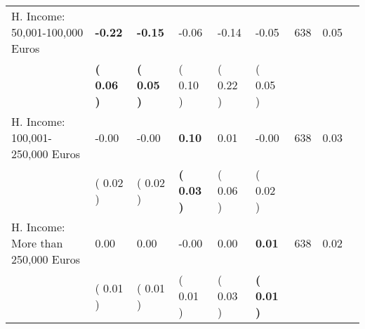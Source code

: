 \begin{tabular}{L{6.2cm} C{1.8cm} C{1.8cm} C{1.8cm} C{1.8cm} C{1.8cm} C{1.8cm} C{0.3cm} C{0.3cm}}
H. Income: 50,001-100,000 Euros & \textbf{    -0.22} & \textbf{    -0.15} &     -0.06 &     -0.14 &     -0.05  & 638 &       0.05 \\ 
 & \textbf{(     0.06 )} & \textbf{(     0.05 )} & (     0.10 ) & (     0.22 ) & (     0.05 )  & \\
H. Income: 100,001-250,000 Euros &     -0.00 &     -0.00 & \textbf{     0.10} &      0.01 &     -0.00  & 638 &       0.03 \\ 
 & (     0.02 ) & (     0.02 ) & \textbf{(     0.03 )} & (     0.06 ) & (     0.02 )  & \\
H. Income: More than 250,000 Euros &      0.00 &      0.00 &     -0.00 &      0.00 & \textbf{     0.01}  & 638 &       0.02 \\ 
 & (     0.01 ) & (     0.01 ) & (     0.01 ) & (     0.03 ) & \textbf{(     0.01 )}  & \\
\bottomrule
\end{tabular}
